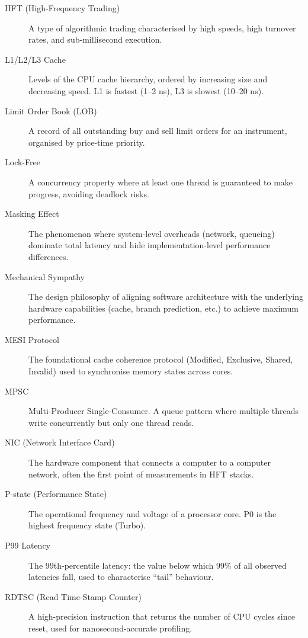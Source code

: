 \documentclass[12pt,a4paper]{report}
\begin{document}
\begin{description}
\item[HFT (High-Frequency Trading)] A type of algorithmic trading characterised by high speeds, high turnover rates, and sub-millisecond execution.

\item[L1/L2/L3 Cache] Levels of the CPU cache hierarchy, ordered by increasing size and decreasing speed. L1 is fastest (1--2 ns), L3 is slowest (10--20 ns).

\item[Limit Order Book (LOB)] A record of all outstanding buy and sell limit orders for an instrument, organised by price-time priority.

\item[Lock-Free] A concurrency property where at least one thread is guaranteed to make progress, avoiding deadlock risks.

\item[Masking Effect] The phenomenon where system-level overheads (network, queueing) dominate total latency and hide implementation-level performance differences.

\item[Mechanical Sympathy] The design philosophy of aligning software architecture with the underlying hardware capabilities (cache, branch prediction, etc.) to achieve maximum performance.

\item[MESI Protocol] The foundational cache coherence protocol (Modified, Exclusive, Shared, Invalid) used to synchronise memory states across cores.

\item[MPSC] Multi-Producer Single-Consumer. A queue pattern where multiple threads write concurrently but only one thread reads.

\item[NIC (Network Interface Card)] The hardware component that connects a computer to a computer network, often the first point of measurements in HFT stacks.

\item[P-state (Performance State)] The operational frequency and voltage of a processor core. P0 is the highest frequency state (Turbo).

\item[P99 Latency] The 99th-percentile latency: the value below which 99\% of all observed latencies fall, used to characterise ``tail'' behaviour.

\item[RDTSC (Read Time-Stamp Counter)] A high-precision instruction that returns the number of CPU cycles since reset, used for nanosecond-accurate profiling.


\end{description}
\end{document}
